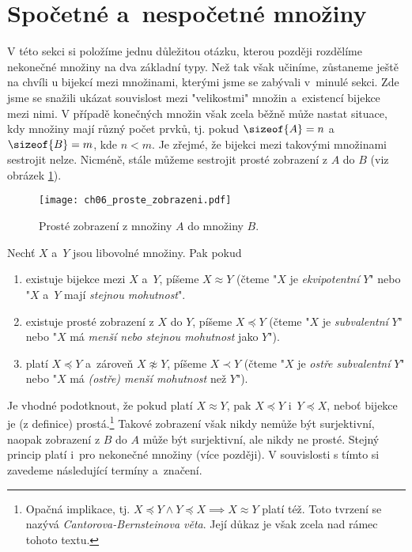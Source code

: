 \section{Spočetné a~nespočetné množiny}\label{sec:spocetne_a_nespocetne_mnoziny}
V této sekci si položíme jednu důležitou otázku, kterou později rozdělíme nekonečné množiny na dva základní typy. Než tak však učiníme, zůstaneme ještě na chvíli u bijekcí mezi množinami, kterými jsme se zabývali v~minulé sekci. Zde jsme se snažili ukázat souvislost mezi "velikostmi" množin a~existencí bijekce mezi nimi. V případě konečných množin však zcela běžně může nastat situace, kdy množiny mají různý počet prvků, tj. pokud $\sizeof{A}=n$ a~$\sizeof{B}=m$, kde $n<m$. Je zřejmé, že bijekci mezi takovými množinami sestrojit nelze. Nicméně, stále můžeme sestrojit prosté zobrazení z $A$ do $B$ (viz obrázek \ref{fig:proste_zobrazeni_A_do_B}).
\begin{figure}[H]
    \centering
    \texttt{[image: ch06\_proste\_zobrazeni.pdf]}
    \caption{Prosté zobrazení z množiny $A$ do množiny $B$.}
    \label{fig:proste_zobrazeni_A_do_B}
\end{figure}
\begin{definition}\label{def:subvalence_a_ekvipotence}
    Nechť $X$ a~$Y$ jsou libovolné množiny. Pak pokud
    \begin{enumerate}[label=(\roman*)]
        \item existuje bijekce mezi $X$ a~$Y$, píšeme $X\approx Y$ (čteme "$X$ je \emph{ekvipotentní} $Y$" nebo "$X$ a~$Y$ mají \emph{stejnou mohutnost}".
        \item existuje prosté zobrazení z $X$ do $Y$, píšeme $X\preccurlyeq Y$ (čteme "$X$ je \emph{subvalentní} $Y$" nebo "$X$ má \emph{menší nebo stejnou mohutnost} jako $Y$").
        \item platí $X\preccurlyeq Y$ a~zároveň $X\napprox Y$, píšeme $X\prec Y$ (čteme "$X$ je \emph{ostře subvalentní} $Y$" nebo "$X$ má \emph{(ostře) menší mohutnost} než $Y$").
    \end{enumerate}
\end{definition}
Je vhodné podotknout, že pokud platí $X\approx Y$, pak $X\preccurlyeq Y$ i~$Y\preccurlyeq X$, neboť bijekce je (z definice) prostá.\footnote{Opačná implikace, tj. $X\preccurlyeq Y \land Y\preccurlyeq X\implies X\approx Y$ platí též. Toto tvrzení se nazývá \emph{Cantorova-Bernsteinova věta}. Její důkaz je však zcela nad rámec tohoto textu.}
Takové zobrazení však nikdy nemůže být surjektivní, naopak zobrazení z $B$ do $A$ může být surjektivní, ale nikdy ne prosté. Stejný princip platí i~pro nekonečné množiny (více později). V souvislosti s tímto si zavedeme následující termíny a~značení.\par
